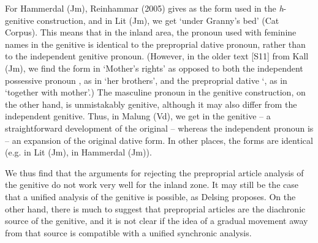 For Hammerdal (Jm), Reinhammar (2005) gives  as the form used in the \textit{h}{}-genitive construction, and in Lit (Jm), we get  ‘under Granny’s bed’ (Cat Corpus). This means that in the inland area, the pronoun used with feminine names in the genitive is identical to the preproprial dative pronoun, rather than to the independent genitive pronoun. (However, in the older text [S11] from Kall (Jm), we find the form  in  ‘Mother’s rights’ as opposed to both the independent possessive pronoun , as in  ‘her brothers’, and the preproprial dative ‘, as in  ‘together with mother’.) The masculine pronoun in the genitive construction, on the other hand, is unmistakably genitive, although it may also differ from the independent genitive. Thus, in Malung (Vd), we get  in the genitive – a straightforward development of the original  – whereas the independent pronoun is  – an expansion of the original dative form. In other places, the forms are identical (e.g.  in Lit (Jm),  in Hammerdal (Jm)). 

We thus find that the arguments for rejecting the preproprial article analysis of the genitive do not work very well for the inland zone. It may still be the case that a unified analysis of the genitive is possible, as Delsing proposes. On the other hand, there is much to suggest that preproprial articles are the diachronic source of the genitive, and it is not clear if the idea of a gradual movement away from that source is compatible with a unified synchronic analysis. 

